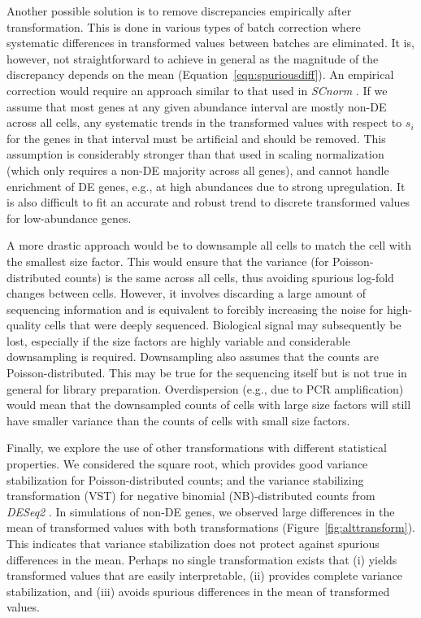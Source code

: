 \documentclass[10pt,letterpaper]{article}
\begin{document}
Another possible solution is to remove discrepancies empirically after transformation.
This is done in various types of batch correction \cite{ritchie2015limma,haghverdi2018batch} where systematic differences in transformed values between batches are eliminated.
It is, however, not straightforward to achieve in general as the magnitude of the discrepancy depends on the mean (Equation~\ref{eqn:spuriousdiff}).
An empirical correction would require an approach similar to that used in \textit{SCnorm} \cite{bacher2017scnorm}.
If we assume that most genes at any given abundance interval are mostly non-DE across all cells, any systematic trends in the transformed values with respect to $s_i$ for the genes in that interval must be artificial and should be removed.
This assumption is considerably stronger than that used in scaling normalization (which only requires a non-DE majority across all genes),
and cannot handle enrichment of DE genes, e.g., at high abundances due to strong upregulation.
It is also difficult to fit an accurate and robust trend to discrete transformed values for low-abundance genes.

A more drastic approach would be to downsample all cells to match the cell with the smallest size factor.
This would ensure that the variance (for Poisson-distributed counts) is the same across all cells, thus avoiding spurious log-fold changes between cells.
However, it involves discarding a large amount of sequencing information and is equivalent to forcibly increasing the noise for high-quality cells that were deeply sequenced.
Biological signal may subsequently be lost, especially if the size factors are highly variable and considerable downsampling is required.
Downsampling also assumes that the counts are Poisson-distributed.
This may be true for the sequencing itself \cite{marioni2008rnaseq} but is not true in general for library preparation.
Overdispersion (e.g., due to PCR amplification) would mean that the downsampled counts of cells with large size factors will still have smaller variance than the counts of cells with small size factors.

Finally, we explore the use of other transformations with different statistical properties.
We considered the square root, which provides good variance stabilization for Poisson-distributed counts;
and the variance stabilizing transformation (VST) for negative binomial (NB)-distributed counts from \emph{DESeq2} \cite{love2014moderated}.
In simulations of non-DE genes, we observed large differences in the mean of transformed values with both transformations (Figure~\ref{fig:alttransform}).
This indicates that variance stabilization does not protect against spurious differences in the mean.
Perhaps no single transformation exists that 
(i) yields transformed values that are easily interpretable,
(ii) provides complete variance stabilization, and
(iii) avoids spurious differences in the mean of transformed values.
\end{document}
